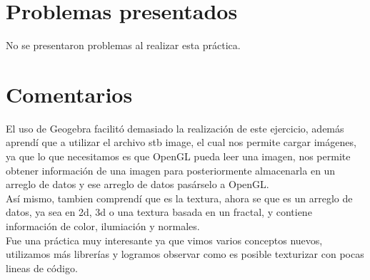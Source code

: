 \documentclass[12pt, a4paper]{article}
\begin{document}
 \raggedright 	
\section{Problemas presentados}
\justify
No se presentaron problemas al realizar esta práctica. \\[.4cm]

\section{Comentarios}
\justify
El uso de Geogebra facilitó demasiado la realización de este ejercicio, además aprendí que a utilizar el archivo stb image, el cual nos permite cargar imágenes, ya que lo que necesitamos es que OpenGL pueda leer una imagen, nos permite obtener información de una imagen para posteriormente almacenarla en un arreglo de datos y ese arreglo de datos pasárselo a OpenGL.\\[.3cm]
Así mismo, tambien comprendí que es la textura, ahora se que es un arreglo de datos, ya sea en 2d, 3d o una textura basada en un fractal, y contiene información de color, ilumiación y normales.\\[.3cm]
Fue una práctica muy interesante ya que vimos varios conceptos nuevos, utilizamos más librerías y logramos observar como es posible texturizar con pocas lineas de código.
\end{document}
